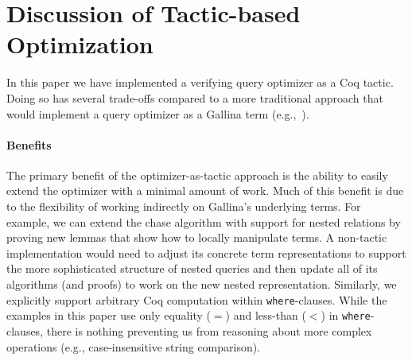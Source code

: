 \documentclass[preprint]{sigplanconf}
\newcommand{\greg}[1]{\textcolor{blue}{GREG: #1}}
\begin{document}



\section{Discussion of Tactic-based Optimization}
\label{sec:discussion}

In this paper we have implemented a verifying query optimizer as a Coq tactic.  Doing so has several trade-offs compared to a more traditional approach that would implement a query optimizer as a Gallina term (e.g.,~\cite{coqdb}).

\paragraph{Benefits}
The primary benefit of the optimizer-as-tactic approach is the ability to easily extend the optimizer with a minimal amount of work.
Much of this benefit is due to the flexibility of working indirectly on Gallina's underlying terms.
For example, we can extend the chase algorithm with support for nested relations by proving new lemmas that show how to locally manipulate terms.
A non-tactic implementation would need to adjust its concrete term representations to support the more sophisticated structure of nested queries and then update all of its algorithms (and proofs) to work on the new nested representation.
Similarly, we explicitly support arbitrary Coq computation within {\tt where}-clauses.
While the examples in this paper use only equality ($=$) and less-than ($<$) in {\tt where}-clauses, there is nothing preventing us from reasoning about more complex operations (e.g., case-insensitive string comparison).
\end{document}
